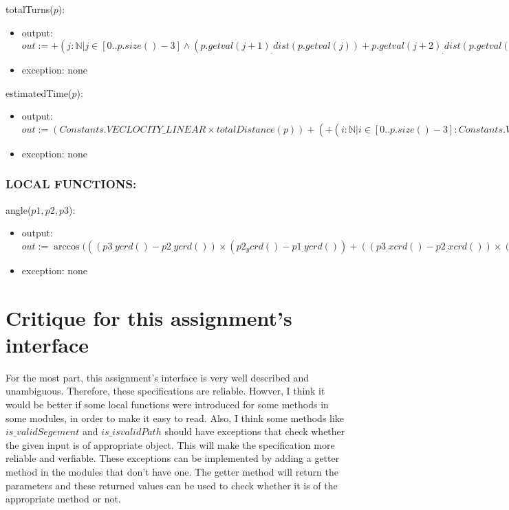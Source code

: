 \documentclass[12pt]{article}
\begin{document}
\noindent totalTurns($p$):
\begin{itemize}
\item output: $\mathit{out} := + ( j: \mathbb{N}  |  j \in [0 ..  p.size()-3] \land (p.getval(j+1)_.dist(p.getval(j)) + p.getval(j+2)_.dist(p.getval(j+1))) \neq p.getval(j+2)_.dist(p.getval(j)) : 1 )$
\item exception: none
\end{itemize}

\noindent estimatedTime($p$):
    \begin{itemize}
    \item output: $\mathit{out} := (Constants.VECLOCITY\_LINEAR\times totalDistance(p)) + ( + ( i: \mathbb{N} | i \in [0 .. p.size()-3] : Constants.VELOCITY\_ANGULAR \times angle(p_.getVal(i), p_.getVal(i+1), p_.getVal(i+2))))$
    \item exception: none
    \end{itemize}

\subsubsection* {LOCAL FUNCTIONS:} 

    \noindent angle($p1, p2, p3$):
    \begin{itemize}
    \item output: $\mathit{out} := \arccos (((p3_.ycrd() - p2_.ycrd()) \times (p2_ycrd() - p1_.ycrd()) + ((p3_.xcrd() - p2_.xcrd()) \times (p2_.xcrd() - p1_.xcrd())) / (p3_.dist(p2) \times p2_.dist(p1)))$
    \item exception: none
    \end{itemize}

\newpage
\section* {Critique for this assignment's interface}

For the most part, this assignment's interface is very well described and unambiguous. Therefore, these specifications are reliable.
\newline Howver, I think it would be better if some local functions were introduced for some methods in some modules, in order to make it easy to read.
\newline Also, I think some methods like $ is\_validSegement$ and $is\_isvalidPath$ should have exceptions that check whether the given input is of appropriate object. This will make the specification more reliable and verfiable. 
\newline These exceptions can be implemented by adding a getter method in the modules that don't have one. The getter method will return the parameters and these returned values can be used to check whether it is of the appropriate method or not.
\end{document}
